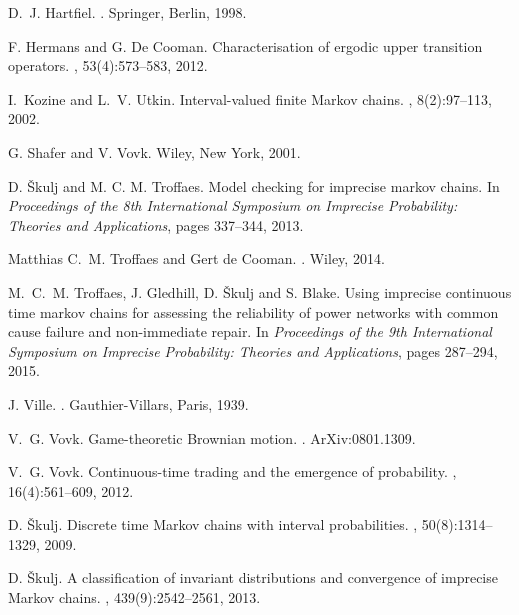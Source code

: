 \documentclass[11pt,dvipsnames,usenames,a4paper]{article}
\begin{document}
\begin{thebibliography}{10}
D.~J. Hartfiel.
. Springer, Berlin, 1998.

F. Hermans and G. De Cooman.
\newblock Characterisation of ergodic upper transition operators.
, 53(4):573--583,
  2012.

I.~Kozine and L.~V. Utkin.
\newblock Interval-valued finite {M}arkov chains.
, 8(2):97--113, 2002.

G. Shafer and V. Vovk.
\newblock Wiley, New York, 2001.

D. \v{S}kulj and M. C. M. Troffaes.
\newblock Model checking for imprecise markov chains. 
\newblock In {\em Proceedings of the 8th International Symposium on Imprecise
  Probability: Theories and Applications}, pages 337--344, 2013.

Matthias C.~M. Troffaes and Gert {d}e Cooman.
.
\newblock Wiley, 2014.

M.~C.~M. Troffaes, J. Gledhill, D. \v{S}kulj and S. Blake.
\newblock Using imprecise continuous time markov chains for assessing the
  reliability of power networks with common cause failure and non-immediate
  repair.
\newblock In {\em Proceedings of the 9th International Symposium on Imprecise
  Probability: Theories and Applications}, pages 287--294, 2015.

J. Ville.
.
\newblock Gauthier-Villars, Paris, 1939.

V.~G. Vovk.
\newblock Game-theoretic {B}rownian motion.
.
\newblock ArXiv:0801.1309.

V.~G. Vovk.
\newblock Continuous-time trading and the emergence of probability.
, 16(4):561--609, 2012.

D. \v{S}kulj.
\newblock Discrete time {M}arkov chains with interval probabilities.
,
  50(8):1314--1329, 2009.

D. \v{S}kulj.
\newblock A classification of invariant distributions and convergence of
  imprecise {M}arkov chains.
, 439(9):2542--2561, 2013.


\end{thebibliography}
\end{document}
